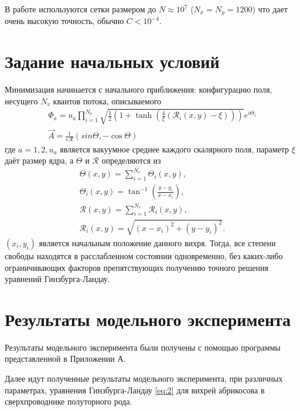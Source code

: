 В работе используются сетки размером до \( N \approx 10^7 \) 
(\( N_x = N_y = 1200 \)) что дает очень высокую точность, обычно 
\( C < 10^{-4} \). \cite{bib:minimization}

\section{Задание начальных условий}

Минимизация начинается с начального приближения: конфигурацию поля, несущего
\( N_v \) квантов потока, описываемого
\begin{gather}
    \Phi_a = u_a \prod\limits_{i=1}^{N_\nu} \sqrt{ 
        \frac{1}{2}\left( 1 + \tanh\left( 
            \frac{4}{\xi}\left( \mathcal{R}_i(x,y) - \xi \right)
        \right) \right)
    } e^{i\Theta_i}
    \nonumber \\
    \vec{A} = \frac{1}{e\mathcal{R}}\left( sin\Theta, -\cos\Theta \right)
    \label{eqm:6}
\end{gather}
где \( a = 1,2, u_a \) является вакуумное среднее каждого скалярного поля, 
параметр \( \xi \) даёт размер ядра, а \( \Theta \) и
\( \mathcal{R} \) определяются из
\begin{gather}
    \Theta(x,y) = \sum\limits_{i=1}^{N_v} \Theta_i(x,y), \nonumber \\
    \Theta_i(x,y) = \tan^{-1}\left(\frac{y-y_i}{x-x_i} \right), \nonumber \\
    \mathcal{R}(x,y) = \sum\limits_{i=1}^{N_v} \mathcal{R}_i(x,y), \nonumber \\
    \mathcal{R}_i(x,y) = \sqrt{(x-x_i)^2+(y-y_i)^2}.
\end{gather}
\( (x_i,y_i) \) является начальным положение данного вихря. Тогда, все степени 
свободы находятся в расслабленном состоянии одновременно, без каких-либо 
ограничивающих факторов препятствующих получению точного решения уравнений 
Гинзбурга-Ландау.
\cite{bib:minimization}

\newpage

\section{Результаты модельного эксперимента}

Результаты модельного эксперимента были получены с помощью программы 
представленной в Приложении А. 

Далее идут полученные результаты модельного эксперимента, при различных 
параметрах, уравнения Гинзбурга-Ландау \eqref{eq:2} для вихрей абрикосова в 
сверхпроводнике полуторного рода.

